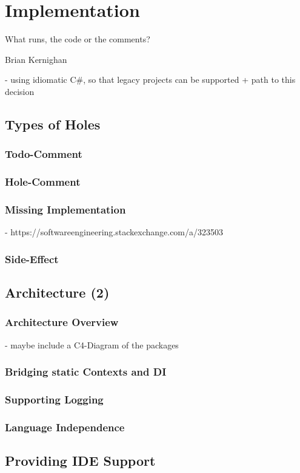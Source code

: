 \chapter[Implementation]{Implementation }
\epigraph{What runs, the code or the comments?}{Brian Kernighan}
- using idiomatic C\#, so that legacy projects can be supported + path to this decision
\section{Types of Holes}
\subsection{Todo-Comment}
\subsection{Hole-Comment}
\subsection{Missing Implementation}
- https://softwareengineering.stackexchange.com/a/323503
\subsection{Side-Effect}
\section{Architecture (2)}
\subsection{Architecture Overview}
- maybe include a C4-Diagram of the packages
\subsection{Bridging static Contexts and DI}
\subsection{Supporting Logging}
\subsection{Language Independence}
\section{Providing IDE Support}
